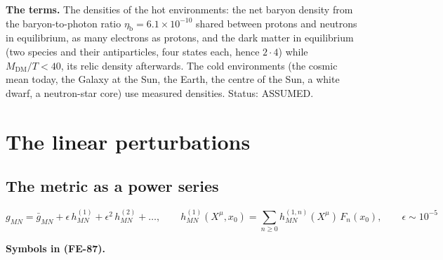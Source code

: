 \documentclass[
  10pt,
]{article}
\begin{document}
\textbf{The terms.} The densities of the hot environments: the net
baryon density from the baryon-to-photon ratio
\(\eta_{\mathrm{b}} = 6.1\times10^{-10}\) shared between protons and
neutrons in equilibrium, as many electrons as protons, and the dark
matter in equilibrium (two species and their antiparticles, four states
each, hence \(2\cdot4\)) while \(M_{\mathrm{DM}}/T < 40\), its relic
density afterwards. The cold environments (the cosmic mean today, the
Galaxy at the Sun, the Earth, the centre of the Sun, a white dwarf, a
neutron-star core) use measured densities. Status: ASSUMED.

\hypertarget{the-linear-perturbations}{%
\section{The linear perturbations}\label{the-linear-perturbations}}

\hypertarget{the-metric-as-a-power-series}{%
\subsection{The metric as a power
series}\label{the-metric-as-a-power-series}}

\[
g_{MN} = \bar g_{MN} + \epsilon\,h^{(1)}_{MN} + \epsilon^2\,h^{(2)}_{MN} + \dots,\qquad
h^{(1)}_{MN}(X^\mu, x_0) = \sum_{n\ge0}h^{(1,n)}_{MN}(X^\mu)\,F_n(x_0),\qquad \epsilon \sim 10^{-5}
 \tag{FE-87}
\]

\textbf{Symbols in (FE-87).}
\end{document}
